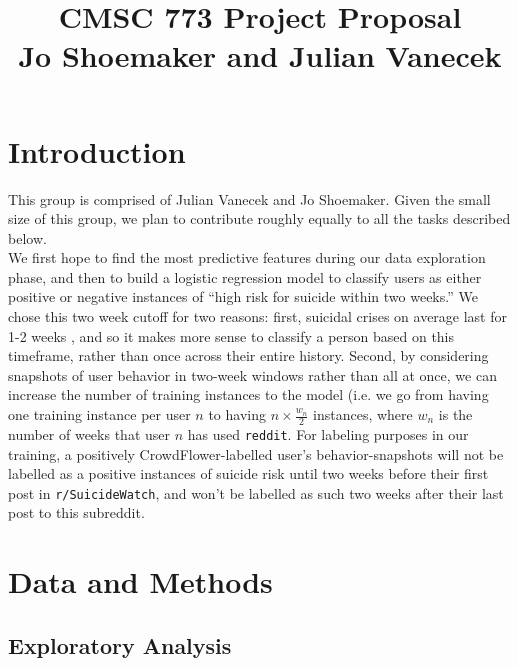 \documentclass[11pt,letterpaper]{article}
\title{{\bfseries CMSC 773 Project Proposal}\\{\small Jo Shoemaker and Julian Vanecek}}
\newcommand{\3}{$|$}
\newcommand{\reddit}{\texttt{reddit}}
\begin{document}
\maketitle
\vspace{-4em}

\section{Introduction}

This group is comprised of Julian Vanecek and Jo Shoemaker. Given the small size of this group, we plan to contribute roughly equally to all the tasks described below.\\
We first hope to find the most predictive features during our data exploration phase, and then to build a logistic regression model to classify users as either positive or negative instances of ``high risk for suicide within two weeks.'' We chose this two week cutoff for two reasons: first, suicidal crises on average last for 1-2 weeks \citep{witte05}, and so it makes more sense to classify a person based on this timeframe, rather than once across their entire history. Second, by considering snapshots of user behavior in two-week windows rather than all at once, we can increase the number of training instances to the model (i.e. we go from having one training instance per user $n$ to having $n \times \frac{w_n}{2}$ instances, where $w_n$ is the number of weeks that user $n$ has used \reddit. For labeling purposes in our training, a positively CrowdFlower-labelled user's behavior-snapshots will not be labelled as a positive instances of suicide risk until two weeks before their first post in \texttt{r/SuicideWatch}, and won't be labelled as such two weeks after their last post to this subreddit. 

\section{Data and Methods}
\subsection{Exploratory Analysis}
\end{document}
